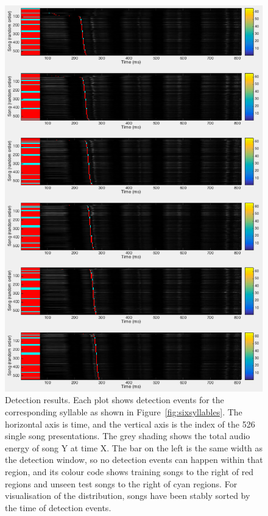 \documentclass{article}
\newcommand\fig[1]{Figure~\ref{#1}}
\begin{document}
\begin{figure}
  \includegraphics[width=\textwidth]{6_syllables_out}
    \caption{Detection results. Each plot shows detection events for
      the corresponding syllable as shown in
      \fig{fig:sixsyllables}. The horizontal axis is time, and the
      vertical axis is the index of the 526 single song
      presentations. The grey shading shows the total audio energy of
      song Y at time X. The bar on the left is the same width as the
      detection window, so no detection events can happen within that
      region, and its colour code shows training songs to the right of
      red regions and unseen test songs to the right of cyan
      regions. For visualisation of the distribution, songs have been
      stably sorted by the time of detection events.}
  \label{fig:sixsyllables_out}
\end{figure}
\end{document}
